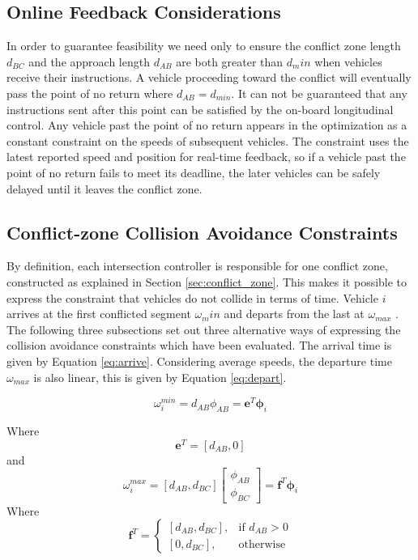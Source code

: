 \subsection{Online Feedback Considerations}
In order to guarantee feasibility we need only to ensure the conflict zone length $d_{BC}$ and the approach length $d_{AB}$ are both greater than $d_min$ when vehicles receive their instructions. A vehicle proceeding toward the conflict will eventually pass the point of no return where $d_{AB} = d_{min}$. It can not be guaranteed that any instructions sent after this point can be satisfied by the on-board longitudinal control. Any vehicle past the point of no return appears in the optimization as a constant constraint on the speeds of subsequent vehicles. The constraint uses the latest reported speed and position for real-time feedback, so if a vehicle past the point of no return fails to meet its deadline, the later vehicles can be safely delayed until it leaves the conflict zone.  

\subsection{Conflict-zone Collision Avoidance Constraints} 
By definition, each intersection controller is responsible for one conflict zone, constructed as explained in Section \ref{sec:conflict_zone}. This makes it
possible to express the constraint that vehicles do not collide
in terms of time. Vehicle $i$ arrives at the first conflicted
segment $\omega_min$ and departs from the last at $\omega_{max}$ . The following three subsections set out three alternative ways
of expressing the collision avoidance constraints which have
been evaluated. The arrival time is given by Equation \ref{eq:arrive}. Considering average speeds, the departure time $\omega_{max}$ is also linear, this is given by Equation \ref{eq:depart}.

\begin{equation}
\label{eq:arrive}
\omega_i^{min} = d_{AB} \phi_{AB} = \bm{e}^T \bm{\phi}_i
\end{equation}

Where
\begin{equation}
\label{eq:e_vec}
\bm{e}^T = [d_{AB}, 0]
\end{equation}
and 
\begin{equation}
\label{eq:depart}
\omega_i^{max} = [d_{AB}, d_{BC}]\left[\begin{array}{c}
\phi_{AB}\\
\phi_{BC}
\end{array}\right] = \bm{f}^T \bm{\phi}_i
\end{equation}
Where
\begin{equation}
\label{eq:f_vec}
\bm{f}^T = \begin{cases}
    [d_{AB}, d_{BC}],& \text{if } d_{AB}> 0\\
    [0, d_{BC}],              & \text{otherwise}
\end{cases}
\end{equation}

